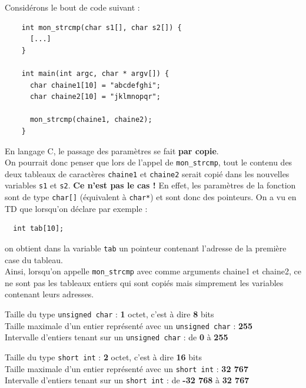 \documentclass[10pt]{article}
\begin{document}
\begin{enumerate}[label=\textbf{[\alph*]}]
  Considérons le bout de code suivant :

  \begin{lstlisting}
    int mon_strcmp(char s1[], char s2[]) {
      [...]
    }

    int main(int argc, char * argv[]) {
      char chaine1[10] = "abcdefghi";
      char chaine2[10] = "jklmnopqr";

      mon_strcmp(chaine1, chaine2);
    }
  \end{lstlisting}

  En langage C, le passage des paramètres se fait \textbf{par copie}. \\

  On pourrait donc penser que lors de l'appel de \texttt{mon\_strcmp}, tout le
  contenu des deux
  tableaux de caractères \texttt{chaine1} et \texttt{chaine2} serait copié dans
  les nouvelles variables \texttt{s1} et \texttt{s2}. \textbf{Ce n'est pas le cas !}
  En effet, les paramètres de la fonction sont de type \texttt{char[]}
  (équivalent à \texttt{char*}) et sont
  donc des pointeurs. On a vu en TD que lorsqu'on déclare par exemple :

\begin{verbatim}
  int tab[10];
\end{verbatim}

  on obtient dans la variable \texttt{tab} un pointeur
  contenant l'adresse de la première case du tableau. \\

  Ainsi, lorsqu'on appelle \texttt{mon\_strcmp} avec comme
  arguments chaine1 et chaine2, ce ne sont pas les tableaux entiers qui sont
  copiés mais simprement les variables contenant leurs adresses.

\item Taille du type \texttt{unsigned char} : \textbf{1} octet, c'est à dire
  \textbf{8} bits \\
  Taille maximale d'un entier représenté avec un \texttt{unsigned char} :
  \textbf{255} \\
  Intervalle d'entiers tenant sur un \texttt{unsigned char} : de
  \textbf{0} à \textbf{255}

\item Taille du type \texttt{short int} : \textbf{2} octet, c'est à dire
  \textbf{16} bits \\
  Taille maximale d'un entier représenté avec un \texttt{short int} :
  \textbf{32 767} \\
  Intervalle d'entiers tenant sur un \texttt{short int} : de
  \textbf{-32 768} à \textbf{32 767}


\end{enumerate}
\end{document}
